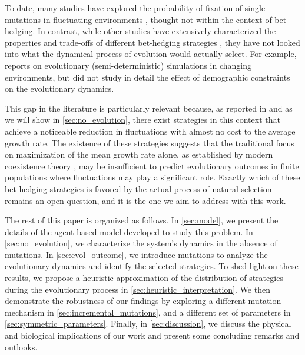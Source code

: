 \documentclass[aps,pre,reprint,10pt,superscriptaddress]{revtex4-2}
\begin{document}
To date, many studies have explored the probability of fixation of single mutations in fluctuating environments \cite{ashcroftFixationFinitePopulations2014,saakianAlleleFixationProbability2019,kaushikTimeFixationChanging2021,askerFixationExtinctionTimefluctuating2025,liuParrondolikeEvolutionaryAdvantage2026}, thought not within the context of bet-hedging. In contrast, while other studies have extensively characterized the properties and trade-offs of different bet-hedging strategies \cite{kussellPhenotypicDiversityPopulation2005,beleteOptimalityAdaptationPhenotypically2015,huftonPhenotypicSwitchingPopulations2018,villamartinBethedgingStrategiesExpanding2019,dinisParetooptimalTradeoffPhenotypic2022}, they have not looked into what the dynamical process of evolution would actually select. For example, \cite{patraEmergencePhenotypeSwitching2015} reports on evolutionary (semi-deterministic) simulations in changing environments, but did not study in detail the effect of demographic constraints on the evolutionary dynamics.

This gap in the literature is particularly relevant because, as reported in \cite{dinisPhaseTransitionsOptimal2020,dinisParetooptimalTradeoffPhenotypic2022} and as we will show in \cref{sec:no_evolution}, there exist strategies in this context that achieve a noticeable reduction in fluctuations with almost no cost to the average growth rate. The existence of these strategies suggests that the traditional focus on maximization of the mean growth rate alone, as established by modern coexistence theory \cite{chessonMultispeciesCompetitionVariable1994,barabasChessonsCoexistenceTheory2018}, may be insufficient to predict evolutionary outcomes in finite populations where fluctuations may play a significant role. Exactly which of these bet-hedging strategies is favored by the actual process of natural selection remains an open question, and it is the one we aim to address with this work.

The rest of this paper is organized as follows. In \cref{sec:model}, we present the details of the agent-based model developed to study this problem. In \cref{sec:no_evolution}, we characterize the system's dynamics in the absence of mutations. In \cref{sec:evol_outcome}, we introduce mutations to analyze the evolutionary dynamics and identify the selected strategies. To shed light on these results, we propose a heuristic approximation of the distribution of strategies during the evolutionary process in \cref{sec:heuristic_interpretation}. We then demonstrate the robustness of our findings by exploring a different mutation mechanism in \cref{sec:incremental_mutations}, and a different set of parameters in \cref{sec:symmetric_parameters}. Finally, in \cref{sec:discussion}, we discuss the physical and biological implications of our work and present some concluding remarks and outlooks.
\end{document}
